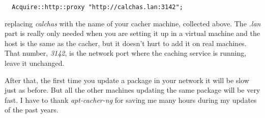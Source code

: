 \documentclass[12pt]{article}
\begin{document}
\begin{verbatim}
  Acquire::http::proxy "http://calchas.lan:3142";
\end{verbatim}

replacing \emph{calchas} with the name of your cacher machine, collected above.
The \emph{.lan} part is really only needed when you are setting it up in a
virtual machine and the host is the same as the cacher, but it doesn't hurt to
add it on real machines. That number, \emph{3142}, is the network port where
the caching service is running, leave it unchanged.

After that, the first time you update a package in your network it will be slow
just as before. But all the other machines updating the same package will be
very fast. I have to thank \emph{apt-cacher-ng} for saving me many hours during
my updates of the past years.
\end{document}

